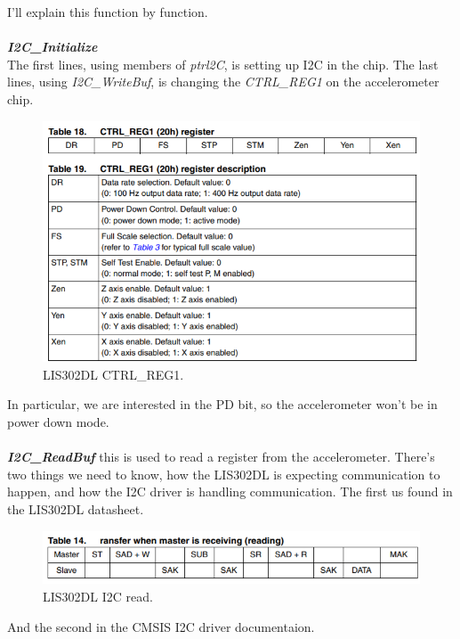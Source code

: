 \documentclass{article}
\begin{document}
I'll explain this function by function.\\
\\
\textbf{\textit{I2C\_Initialize}}\\
The first lines, using members of \textit{ptrl2C}, is setting up I2C in the chip.
The last lines, using \textit{I2C\_WriteBuf}, is changing the \textit{CTRL\_REG1}
on the accelerometer chip.
\begin{figure}[H]
    \centering
    \includegraphics[width=0.8\linewidth]{pics/ctrl_reg1.png}
    \caption{LIS302DL CTRL\_REG1.}
    \label{fig:ctrl_reg1}
\end{figure}
In particular, we are interested in the PD bit, so the accelerometer won't be in
power down mode.\\
\\
\textbf{\textit{I2C\_ReadBuf}} this is used to read a register from the accelerometer.
There's two things we need to know, how the LIS302DL is expecting communication to happen, 
and how the I2C driver is handling communication. The first us found in the LIS302DL datasheet.
\begin{figure}[H]
    \centering
    \includegraphics[width=0.8\linewidth]{pics/I2CRead.png}
    \caption{LIS302DL I2C read.}
    \label{fig:I2CRead}
\end{figure}
And the second in the CMSIS I2C driver documentaion.
\end{document}
